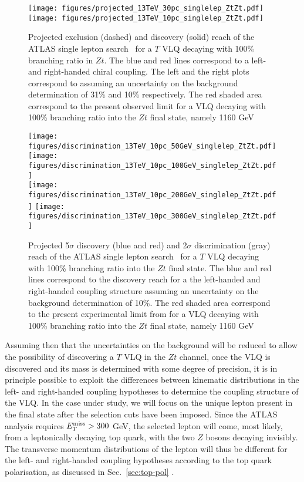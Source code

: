 \documentclass[a4paper]{article}
\begin{document}
\begin{figure}[!htbp]
\centering
\texttt{[image: figures/projected\_13TeV\_30pc\_singlelep\_ZtZt.pdf]}\hfill
\texttt{[image: figures/projected\_13TeV\_10pc\_singlelep\_ZtZt.pdf]}\hfill
\caption{\label{fig:atlas-proj}Projected exclusion (dashed) and discovery (solid) reach of the ATLAS single lepton search~\cite{Aaboud:2017qpr} for a $T$ VLQ decaying with 100\% branching ratio in $Zt$. The blue and red lines correspond to a left- and right-handed chiral coupling. The left and the right plots correspond to assuming an uncertainty on the background determination of 31\% and 10\% respectively. The red shaded area correspond to the present observed limit for a VLQ decaying with 100\% branching ratio into the $Zt$ final state, namely 1160 GeV~\cite{Aaboud:2017qpr}}
\end{figure}

\begin{figure}[h!]
\centering
\texttt{[image: figures/discrimination\_13TeV\_10pc\_50GeV\_singlelep\_ZtZt.pdf]}\hfill
\texttt{[image: figures/discrimination\_13TeV\_10pc\_100GeV\_singlelep\_ZtZt.pdf]}\\[10pt]
\texttt{[image: figures/discrimination\_13TeV\_10pc\_200GeV\_singlelep\_ZtZt.pdf]}\hfill
\texttt{[image: figures/discrimination\_13TeV\_10pc\_300GeV\_singlelep\_ZtZt.pdf]}\\
\caption{\label{fig:13-discr}Projected 5$\sigma$ discovery (blue and red) and 2$\sigma$ discrimination (gray) reach of the ATLAS single lepton search~\cite{Aaboud:2017qpr} for a $T$ VLQ decaying with 100\% branching ratio into the $Zt$ final state. The blue and red lines correspond to the discovery reach for a the left-handed and right-handed coupling structure assuming an uncertainty on the background determination of 10\%. The red shaded area correspond to the present experimental limit from for a VLQ decaying with 100\% branching ratio into the $Zt$ final state, namely 1160 GeV~\cite{Aaboud:2017qpr}}
\end{figure}

Assuming then that the uncertainties on the background will be reduced to allow the possibility of discovering a $T$ VLQ in the $Zt$ channel, once the VLQ is discovered and its mass is determined with some degree of precision, it is in principle possible to exploit the differences between kinematic distributions in the left- and right-handed coupling hypotheses to determine the coupling structure of the VLQ. In the case under study, we will focus on the unique lepton present in the final state after the selection cuts have been imposed. Since the ATLAS analysis requires $E_T^{\rm miss}>300$ GeV, the selected lepton will come, most likely, from a leptonically decaying top quark, with the two $Z$ bosons decaying invisibly. The transverse momentum distributions of the lepton will thus be different for the left- and right-handed coupling hypotheses according to the top quark polarisation, as discussed in Sec.~\ref{sec:top-pol} .
\end{document}
